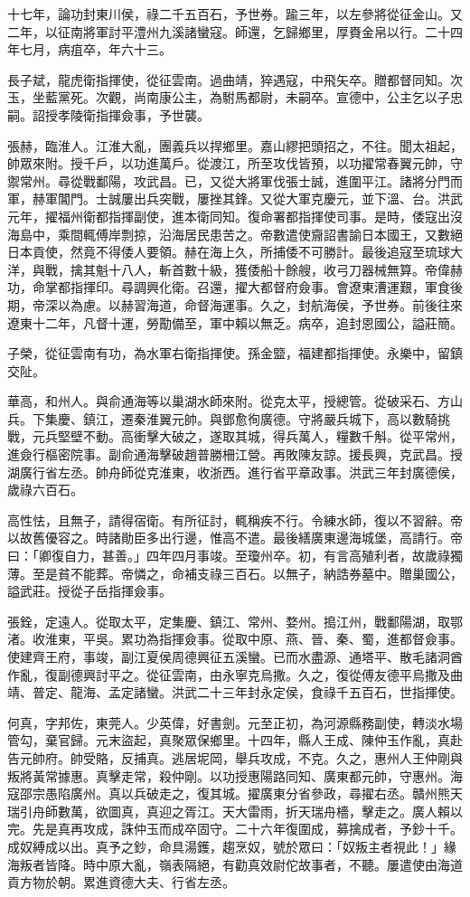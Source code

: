 \begin{pinyinscope}
十七年，論功封東川侯，祿二千五百石，予世券。踰三年，以左參將從征金山。又二年，以征南將軍討平澧州九溪諸蠻寇。師還，乞歸鄉里，厚賚金帛以行。二十四年七月，病疽卒，年六十三。

長子斌，龍虎衛指揮使，從征雲南。過曲靖，猝遇寇，中飛矢卒。贈都督同知。次玉，坐藍黨死。次觀，尚南康公主，為駙馬都尉，未嗣卒。宣德中，公主乞以子忠嗣。詔授孝陵衛指揮僉事，予世襲。

張赫，臨淮人。江淮大亂，團義兵以捍鄉里。嘉山繆把頭招之，不往。聞太祖起，帥眾來附。授千戶，以功進萬戶。從渡江，所至攻伐皆預，以功擢常春翼元帥，守禦常州。尋從戰鄱陽，攻武昌。已，又從大將軍伐張士誠，進圍平江。諸將分門而軍，赫軍閶門。士誠屢出兵突戰，屢挫其鋒。又從大軍克慶元，並下溫、台。洪武元年，擢福州衛都指揮副使，進本衛同知。復命署都指揮使司事。是時，倭寇出沒海島中，乘間輒傅岸剽掠，沿海居民患苦之。帝數遣使齎詔書諭日本國王，又數絕日本貢使，然竟不得倭人要領。赫在海上久，所捕倭不可勝計。最後追寇至琉球大洋，與戰，擒其魁十八人，斬首數十級，獲倭船十餘艘，收弓刀器械無算。帝偉赫功，命掌都指揮印。尋調興化衛。召還，擢大都督府僉事。會遼東漕運艱，軍食後期，帝深以為慮。以赫習海道，命督海運事。久之，封航海侯，予世券。前後往來遼東十二年，凡督十運，勞勩備至，軍中賴以無乏。病卒，追封恩國公，謚莊簡。

子榮，從征雲南有功，為水軍右衛指揮使。孫金盬，福建都指揮使。永樂中，留鎮交阯。

華高，和州人。與俞通海等以巢湖水師來附。從克太平，授總管。從破采石、方山兵。下集慶、鎮江，遷秦淮翼元帥。與鄧愈徇廣德。守將嚴兵城下，高以數騎挑戰，元兵堅壁不動。高衝擊大破之，遂取其城，得兵萬人，糧數千斛。從平常州，進僉行樞密院事。副俞通海擊破趙普勝柵江營。再敗陳友諒。援長興，克武昌。授湖廣行省左丞。帥舟師從克淮東，收浙西。進行省平章政事。洪武三年封廣德侯，歲祿六百石。

高性怯，且無子，請得宿衛。有所征討，輒稱疾不行。令練水師，復以不習辭。帝以故舊優容之。時諸勛臣多出行邊，惟高不遣。最後繕廣東邊海城堡，高請行。帝曰：「卿復自力，甚善。」四年四月事竣。至瓊州卒。初，有言高殖利者，故歲祿獨薄。至是貧不能葬。帝憐之，命補支祿三百石。以無子，納誥券墓中。贈巢國公，謚武莊。授從子岳指揮僉事。

張銓，定遠人。從取太平，定集慶、鎮江、常州、婺州。搗江州，戰鄱陽湖，取鄂渚。收淮東，平吳。累功為指揮僉事。從取中原、燕、晉、秦、蜀，進都督僉事。使建齊王府，事竣，副江夏侯周德興征五溪蠻。已而水盡源、通塔平、散毛諸洞酋作亂，復副德興討平之。從征雲南，由永寧克烏撒。久之，復從傅友德平烏撒及曲靖、普定、龍海、孟定諸蠻。洪武二十三年封永定侯，食祿千五百石，世指揮使。

何真，字邦佐，東莞人。少英偉，好書劍。元至正初，為河源縣務副使，轉淡水場管勾，棄官歸。元末盜起，真聚眾保鄉里。十四年，縣人王成、陳仲玉作亂，真赴告元帥府。帥受賂，反捕真。逃居坭岡，舉兵攻成，不克。久之，惠州人王仲剛與叛將黃常據惠。真擊走常，殺仲剛。以功授惠陽路同知、廣東都元帥，守惠州。海寇邵宗愚陷廣州。真以兵破走之，復其城。擢廣東分省參政，尋擢右丞。贛州熊天瑞引舟師數萬，欲圖真，真迎之胥江。天大雷雨，折天瑞舟檣，擊走之。廣人賴以完。先是真再攻成，誅仲玉而成卒固守。二十六年復圍成，募擒成者，予鈔十千。成奴縛成以出。真予之鈔，命具湯鑊，趨烹奴，號於眾曰：「奴叛主者視此！」緣海叛者皆降。時中原大亂，嶺表隔絕，有勸真效尉佗故事者，不聽。屢遣使由海道貢方物於朝。累進資德大夫、行省左丞。


\end{pinyinscope}
